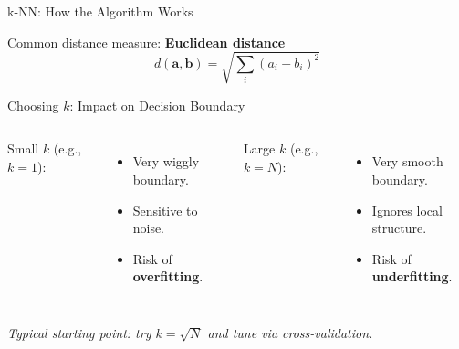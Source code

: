 \documentclass[10pt]{beamer}
\begin{document}
\begin{frame}{k-NN: How the Algorithm Works}
    \begin{center}
    \end{center}
    \vspace{0.15cm}
    Common distance measure: \textbf{Euclidean distance}
    \[
      d(\mathbf{a},\mathbf{b}) = \sqrt{\sum_i (a_i - b_i)^2}
    \]
\end{frame}

\begin{frame}{Choosing $k$: Impact on Decision Boundary}
    \begin{columns}[T,onlytextwidth]
        Small $k$ (e.g., $k=1$):
        \begin{itemize}
            \item Very wiggly boundary.
            \item Sensitive to noise.
            \item Risk of \textbf{overfitting}.
        \end{itemize}
        Large $k$ (e.g., $k=N$):
        \begin{itemize}
            \item Very smooth boundary.
            \item Ignores local structure.
            \item Risk of \textbf{underfitting}.
        \end{itemize}
    \end{columns}
    \vspace{0.3cm}
    \textit{Typical starting point: try $k = \sqrt{N}$ and tune via cross-validation.}
\end{frame}
\end{document}
